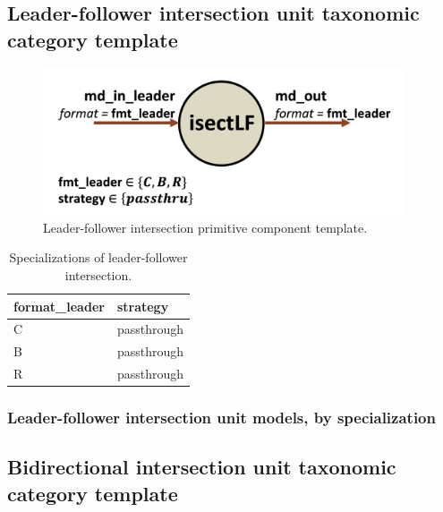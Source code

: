 \subsection{Leader-follower intersection unit taxonomic category template}

\begin{figure}[H]
    \centering
    \includegraphics[width=0.95\textwidth]{figures/isectlf.png}
    \caption{Leader-follower intersection primitive component template.}
    \label{fig:isectlf}
\end{figure}

\begin{table}[H]
\centering
\begin{tabular}{ll}
\toprule
 format\_leader   & strategy    \\
\midrule
 C               & passthrough \\
 B               & passthrough \\
 R               & passthrough \\
\bottomrule
\end{tabular}
\caption{Specializations of leader-follower intersection.}
\label{tab:IntersectionLeaderFollower_specializations}
\end{table}

\subsubsection{Leader-follower intersection unit models, by specialization}

\subsection{Bidirectional intersection unit taxonomic category template}

